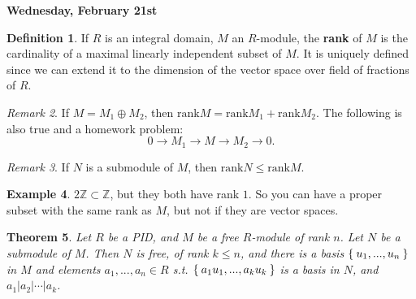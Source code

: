 \documentclass[12pt]{amsbook}
\theoremstyle{plain}
\newtheorem{theorem}{Theorem}[chapter]
\numberwithin{section}{chapter}
\numberwithin{equation}{chapter}
\theoremstyle{definition}
\newtheorem{Def}[theorem]{Definition}
\newtheorem{Ex}[theorem]{Example}
\theoremstyle{remark}
\newtheorem{rem}[theorem]{Remark}
\newcommand{\z}{\mathbb{Z}}
\newcommand{\bb}{\vspace{3mm}}
\newcommand{\rank}{\text{rank}}
\renewcommand{\leq}{\leqslant}
\begin{document}
\bb\bb

\textbf{Wednesday, February 21st}

\begin{Def}
If $R$ is an integral domain, $M$ an $R$-module, the \textbf{rank} of $M$ is the cardinality of a maximal linearly independent subset of $M$. It is uniquely defined since we can extend it to the dimension of the vector space over field of fractions of $R$. 
\end{Def}

\begin{rem}
If $M = M_1 \oplus M_2$, then $\rank M = \rank M_1 + \rank M_2$. The following is also true and a homework problem:
$$
0 \to M_1 \to M \to M_2 \to 0.
$$
\end{rem}

\begin{rem}
If $N$ is a submodule of $M$, then $\rank N \leq \rank M$. 
\end{rem}

\begin{Ex}
$2 \z \subset \z$, but they both have rank $1$. So you can have a proper subset with the same rank as $M$, but not if they are vector spaces. 
\end{Ex}

\begin{theorem}\label{thm1213}
Let $R$ be a PID, and $M$ be a free $R$-module of rank $n$. Let $N$ be a submodule of $M$. Then $N$ is free, of rank $k \leq n$, and there is a basis $\Set{u_1,...,u_n}$ in $M$ and elements $a_1,...,a_n \in R$ s.t. $\Set{a_1u_1,...,a_ku_k}$ is a basis in $N$, and $a_1|a_2|\cdots|a_k$. 
\end{theorem}
\end{document}
